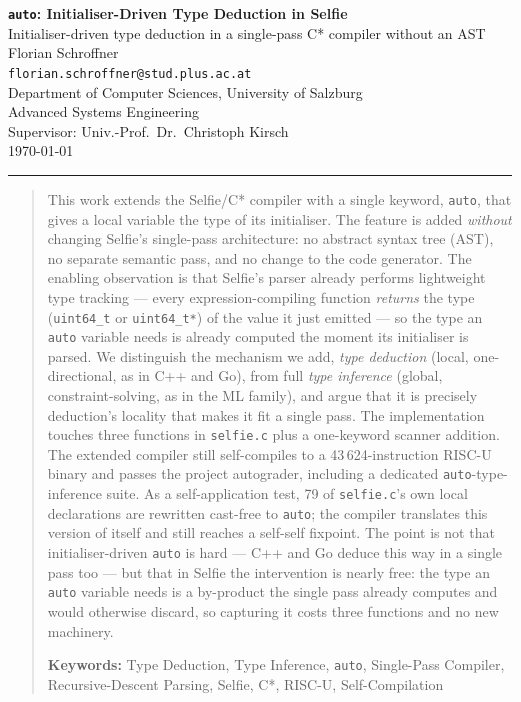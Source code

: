 \documentclass[a4paper,11pt]{article}
\begin{document}
\begin{center}
  {\LARGE \textbf{\textcolor{headcolor}{\texttt{auto}: Initialiser-Driven Type Deduction in Selfie}}}\\[0.4cm]
  {\large Initialiser-driven type deduction in a single-pass C* compiler without an AST}\\[0.6cm]
  {\normalsize
    Florian Schroffner\\
    \texttt{florian.schroffner@stud.plus.ac.at}\\
    Department of Computer Sciences, University of Salzburg\\
    Advanced Systems Engineering\\
    Supervisor: Univ.-Prof.\ Dr.\ Christoph Kirsch\\[0.2cm]
    \today
  }
\end{center}

\vspace{0.3cm}
\hrule height 1pt
\vspace{0.5cm}

\begin{abstract}
\noindent
This work extends the Selfie/C* compiler with a single keyword, \texttt{auto}, that gives a local variable the type of its initialiser. The feature is added \emph{without} changing Selfie's single-pass architecture: no abstract syntax tree (AST), no separate semantic pass, and no change to the code generator. The enabling observation is that Selfie's parser already performs lightweight type tracking --- every expression-compiling function \emph{returns} the type (\texttt{uint64\_t} or \texttt{uint64\_t*}) of the value it just emitted --- so the type an \texttt{auto} variable needs is already computed the moment its initialiser is parsed. We distinguish the mechanism we add, \emph{type deduction} (local, one-directional, as in C++ and Go), from full \emph{type inference} (global, constraint-solving, as in the ML family), and argue that it is precisely deduction's locality that makes it fit a single pass. The implementation touches three functions in \texttt{selfie.c} plus a one-keyword scanner addition. The extended compiler still self-compiles to a 43\,624-instruction RISC-U binary and passes the project autograder, including a dedicated \texttt{auto}-type-inference suite. As a self-application test, 79 of \texttt{selfie.c}'s own local declarations are rewritten cast-free to \texttt{auto}; the compiler translates this version of itself and still reaches a self-self fixpoint. The point is not that initialiser-driven \texttt{auto} is hard --- C++ and Go deduce this way in a single pass too --- but that in Selfie the intervention is nearly free: the type an \texttt{auto} variable needs is a by-product the single pass already computes and would otherwise discard, so capturing it costs three functions and no new machinery.

\vspace{4pt}
\noindent\textbf{Keywords:} Type Deduction, Type Inference, \texttt{auto}, Single-Pass Compiler, Recursive-Descent Parsing, Selfie, C*, RISC-U, Self-Compilation
\end{abstract}
\end{document}
